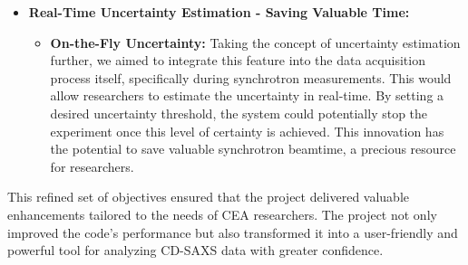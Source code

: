 \begin{itemize}
\begin{itemize}
    \end{itemize}
    \item \textbf{Real-Time Uncertainty Estimation - Saving Valuable Time:}
    \begin{itemize}
        \item \textbf{On-the-Fly Uncertainty:} Taking the concept of uncertainty estimation further, we aimed to integrate this feature into the data acquisition process itself, specifically during synchrotron measurements. This would allow researchers to estimate the uncertainty in real-time. By setting a desired uncertainty threshold, the system could potentially stop the experiment once this level of certainty is achieved. This innovation has the potential to save valuable synchrotron beamtime, a precious resource for researchers.
    \end{itemize}
\end{itemize}

This refined set of objectives ensured that the project delivered valuable enhancements tailored to the needs of CEA researchers. The project not only improved the code's performance but also transformed it into a user-friendly and powerful tool for analyzing CD-SAXS data with greater confidence.
